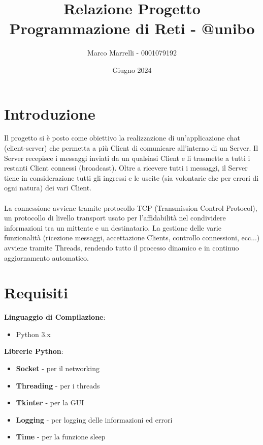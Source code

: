 \documentclass[a4paper,12pt]{report}
\title{Relazione Progetto\\Programmazione di Reti - @unibo}
\author{Marco Marrelli - 0001079192}
\date{Giugno 2024}
\begin{document}
    \maketitle

    \tableofcontents

    \chapter*{Introduzione}

        Il progetto si è posto come obiettivo la realizzazione di un'applicazione chat (client-server) che permetta a più Client di comunicare all'interno di un Server.
        Il Server recepisce i messaggi inviati da un qualsiasi Client e li trasmette a tutti i restanti Client connessi (broadcast).
        Oltre a ricevere tutti i messaggi, il Server tiene in considerazione tutti gli ingressi e le uscite (sia volontarie che per errori di ogni natura) dei vari Client.
        \\ \\
        La connessione avviene tramite protocollo TCP (Transmission Control Protocol), un protocollo di livello transport usato per l'affidabilità nel condividere informazioni tra un mittente e un destinatario.
        La gestione delle varie funzionalità (ricezione messaggi, accettazione Clients, controllo connessioni, ecc...) avviene tramite Threads, rendendo tutto il processo dinamico e in continuo aggiornamento automatico.

    \chapter*{Requisiti}

        \textbf{Linguaggio di Compilazione}:
        \begin{itemize}
            \item Python 3.x
        \end{itemize}
        \textbf{Librerie Python}:
        \begin{itemize}
            \item \textbf{Socket} - per il networking
            \item \textbf{Threading} - per i threads
            \item \textbf{Tkinter} - per la GUI
            \item \textbf{Logging} - per logging delle informazioni ed errori
            \item \textbf{Time} - per la funzione sleep
        \end{itemize}
\end{document}
